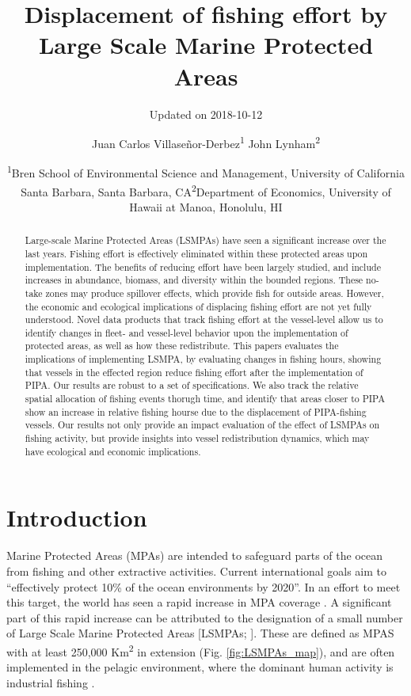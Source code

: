 \documentclass[11pt,]{article}
\title{Displacement of fishing effort by Large Scale Marine Protected Areas}
\subtitle{Updated on 2018-10-12}
\author{Juan Carlos Villaseñor-Derbez\textsuperscript{1} John
Lynham\textsuperscript{2}}
\date{\textsuperscript{1}Bren School of Environmental Science and Management,
University of California Santa Barbara, Santa Barbara,
CA\newline \textsuperscript{2}Department of Economics, University of
Hawaii at Manoa, Honolulu, HI}
\begin{document}
\maketitle
\begin{abstract}
Large-scale Marine Protected Areas (LSMPAs) have seen a significant
increase over the last years. Fishing effort is effectively eliminated
within these protected areas upon implementation. The benefits of
reducing effort have been largely studied, and include increases in
abundance, biomass, and diversity within the bounded regions. These
no-take zones may produce spillover effects, which provide fish for
outside areas. However, the economic and ecological implications of
displacing fishing effort are not yet fully understood. Novel data
products that track fishing effort at the vessel-level allow us to
identify changes in fleet- and vessel-level behavior upon the
implementation of protected areas, as well as how these redistribute.
This papers evaluates the implications of implementing LSMPA, by
evaluating changes in fishing hours, showing that vessels in the
effected region reduce fishing effort after the implementation of PIPA.
Our results are robust to a set of specifications. We also track the
relative spatial allocation of fishing events thorugh time, and identify
that areas closer to PIPA show an increase in relative fishing hourse
due to the displacement of PIPA-fishing vessels. Our results not only
provide an impact evaluation of the effect of LSMPAs on fishing
activity, but provide insights into vessel redistribution dynamics,
which may have ecological and economic implications.
\end{abstract}

\hypertarget{introduction}{%
\section{Introduction}\label{introduction}}

Marine Protected Areas (MPAs) are intended to safeguard parts of the
ocean from fishing and other extractive activities. Current
international goals aim to ``effectively protect 10\% of the ocean
environments by 2020''. In an effort to meet this target, the world has
seen a rapid increase in MPA coverage \citep{wood_2008,sala_2018}. A
significant part of this rapid increase can be attributed to the
designation of a small number of Large Scale Marine Protected Areas
{[}LSMPAs; \citep{gray_2017}{]}. These are defined as MPAS with at least
250,000 Km\textsuperscript{2} in extension (Fig. \ref{fig:LSMPAs_map}),
and are often implemented in the pelagic environment, where the dominant
human activity is industrial fishing
\citep{toonen_2013,gray_2017,kroodsma_2018}.
\end{document}
